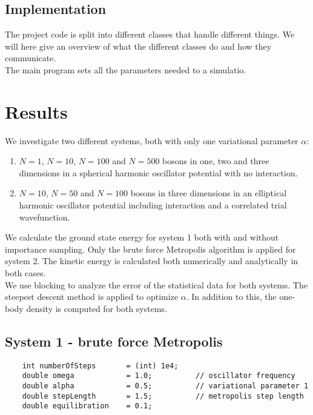 \documentclass[english, a4paper]{article}
\begin{document}
\subsection*{Implementation}

The project code is split into different classes that handle different things. We will here give an overview
of what the different classes do and how they communicate. \\

\noindent The main program sets all the parameters needed to a simulatio. 


\section*{Results}

We investigate two different systems, both with only one variational parameter $\alpha$:
\begin{enumerate}
 \item $N=1$, $N=10$, $N=100$ and $N=500$ bosons in one, two and three dimensions in a
       spherical harmonic oscillator potential with no interaction.       
 \item $N=10$, $N=50$ and $N=100$ bosons in three dimensions
       in an elliptical harmonic oscillator potential including interaction and a
       correlated trial wavefunction. 
\end{enumerate}

We calculate the ground state energy for system 1 both with and without importance sampling.
Only the brute force Metropolis algorithm is applied for system 2.
The kinetic energy is calculated both numerically and analytically in both cases.\\

\noindent We use blocking to analyze the error of the statistical data for both systems.
The steepest descent method is applied to optimize $\alpha$. 
In addition to this, the one-body density is computed for both systems.


\subsection*{System 1 - brute force Metropolis}

\begin{lstlisting}
    int numberOfSteps       = (int) 1e4;
    double omega            = 1.0;          // oscillator frequency
    double alpha            = 0.5;          // variational parameter 1
    double stepLength       = 1.5;          // metropolis step length
    double equilibration    = 0.1;          
\end{lstlisting}
\end{document}
